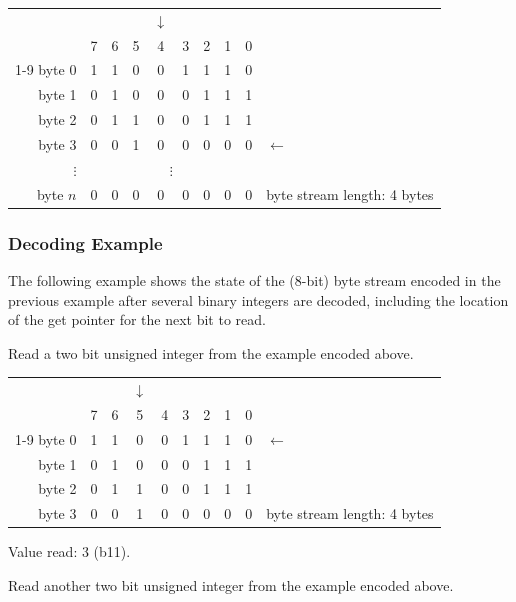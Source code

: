 \documentclass[11pt,letterpaper]{article}
\begin{document}
\begin{tabular}{rccccccccl}
                    &   &   &   &$\downarrow$&&&&   &            \\
        \hfill\vline& 7 & 6 & 5 & 4 & 3 & 2 & 1 & 0 &            \\\cline{1-9}
byte 0  \hfill\vline& 1 & 1 & 0 & 0 & 1 & 1 & 1 & 0 &            \\
byte 1  \hfill\vline& 0 & 1 & 0 & 0 & 0 & 1 & 1 & 1 &            \\
byte 2  \hfill\vline& 0 & 1 & 1 & 0 & 0 & 1 & 1 & 1 &            \\
byte 3  \hfill\vline& 0 & 0 & 1 & 0 & 0 & 0 & 0 & 0 &$\leftarrow$\\
\hfill$\vdots$\hfill\vline&\multicolumn{8}{c}{$\vdots$}&         \\
byte $n$\hfill\vline& 0 & 0 & 0 & 0 & 0 & 0 & 0 & 0 &
byte stream length: 4 bytes
\end{tabular}
\vspace{\baselineskip}

\subsubsection{Decoding Example}

The following example shows the state of the (8-bit) byte stream encoded in the
 previous example after several binary integers are decoded, including the
 location of the get pointer for the next bit to read.

Read a two bit unsigned integer from the example encoded above.

\begin{tabular}{rccccccccl}
                    &   &   &$\downarrow$&&&&   &   &            \\
        \hfill\vline& 7 & 6 & 5 & 4 & 3 & 2 & 1 & 0 &            \\\cline{1-9}
byte 0  \hfill\vline& 1 & 1 & 0 & 0 & 1 & 1 & 1 & 0 &$\leftarrow$\\
byte 1  \hfill\vline& 0 & 1 & 0 & 0 & 0 & 1 & 1 & 1 &            \\
byte 2  \hfill\vline& 0 & 1 & 1 & 0 & 0 & 1 & 1 & 1 &            \\
byte 3  \hfill\vline& 0 & 0 & 1 & 0 & 0 & 0 & 0 & 0 &
byte stream length: 4 bytes
\end{tabular}
\vspace{\baselineskip}

Value read: 3 (b11).

Read another two bit unsigned integer from the example encoded above.
\end{document}
